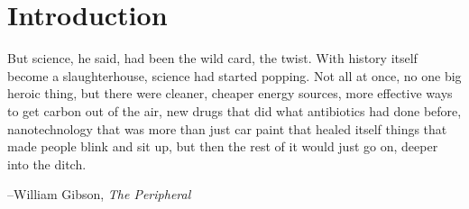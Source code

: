

\part{Introduction}
\label{part:intro}


\thispagestyle{plain}
\begin{center}
  \begin{minipage}{0.8\textwidth}


    But science, he said, had been the wild card, the twist. With \el history itself become a slaughterhouse, science had started popping. Not all at once, no one big heroic thing, but there were cleaner, cheaper energy sources, more effective ways to get carbon out of the air, new drugs that did what antibiotics had done before, nanotechnology that was more than just car paint that healed itself \el things that made people blink and sit up, but then the rest of it would just go on, deeper into the ditch.

    \vspace{\baselineskip}
    {\hfill\raggedright --William Gibson, \textit{The Peripheral}\hspace{0.25cm}}
  \end{minipage}
\end{center}
\vspace{1\baselineskip}




